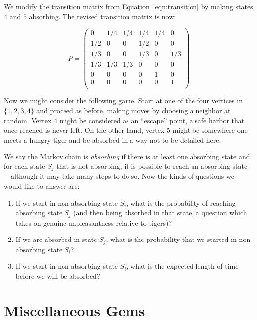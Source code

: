 \begin{example}
We modify the transition matrix from Equation~\ref{eqn:transition} by 
making states $4$ and $5$ absorbing.  The revised transition matrix is now:

\begin{equation}\label{eqn:absorbing}
P =\begin{pmatrix}
      0 & 1/4 & 1/4 & 1/4 & 1/4 &   0 \\
    1/2 &   0 &   0 & 1/2 &   0 &   0 \\
    1/3 &   0 &   0 & 1/3 &   0 & 1/3 \\
    1/3 & 1/3 & 1/3 &   0 &   0 &   0 \\
      0 &   0 &   0 &   0 &   1 &   0 \\
      0 &   0 &   0 &   0 &   0 &   1 \\
   \end{pmatrix}
\end{equation} 
\end{example}
Now we might consider the following game.  Start at one of the
four vertices in $\{1,2,3,4\}$ and proceed as before, making
moves by choosing a neighbor at random.  Vertex $4$ might
be considered as an ``escape'' point, a safe harbor that once
reached is never left.  On the other hand, vertex $5$ might
be somewhere one meets a hungry tiger and be absorbed in a
way not to be detailed here.

We say the Markov chain is \textit{absorbing} if there is at least one
absorbing state and for each state $S_j$ that is not absorbing, it is possible
to reach an absorbing state---although it may take many steps to do so.
Now the kinds of questions we would like to answer are:

\begin{enumerate}
\item If we start in non-absorbing state $S_i$, what is the probability
of reaching absorbing state $S_j$ (and then being absorbed in that state,
a question which takes on genuine unpleasantness relative to tigers)?
\item If we are absorbed in state $S_j$, what is the probability
that we started in non-absorbing state $S_i$? 
\item If we start in non-absorbing state $S_i$, what is the expected length of
time before we will be absorbed?
\end{enumerate}

\section{Miscellaneous Gems}

